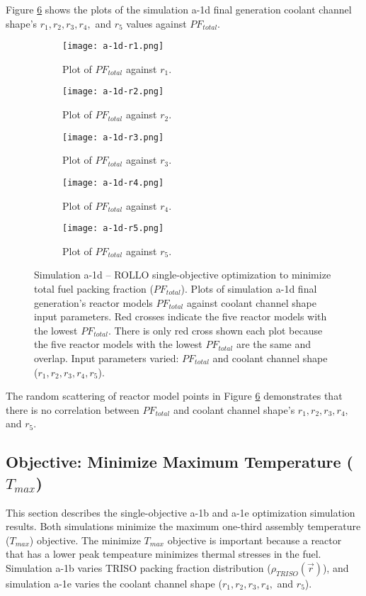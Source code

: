 Figure \ref{fig:a-1d} shows the plots of the simulation a-1d final generation 
coolant channel shape's $r_1, r_2, r_3, r_4,$ and $r_5$ values against $PF_{total}$. 
\begin{figure}[htbp!]
    \centering
    \begin{subfigure}{0.49\textwidth}
        \texttt{[image: a-1d-r1.png]}
        \caption{Plot of $PF_{total}$ against $r_1$.}
        \label{fig:a-1d-r1} 
    \end{subfigure}
    \begin{subfigure}{0.49\textwidth}
        \texttt{[image: a-1d-r2.png]}
        \caption{Plot of $PF_{total}$ against $r_2$.}
        \label{fig:a-1d-r2} 
    \end{subfigure}
    \begin{subfigure}{0.49\textwidth}
        \texttt{[image: a-1d-r3.png]}
        \caption{Plot of $PF_{total}$ against $r_3$.}
        \label{fig:a-1d-r3} 
    \end{subfigure}
    \begin{subfigure}{0.49\textwidth}
        \texttt{[image: a-1d-r4.png]}
        \caption{Plot of $PF_{total}$ against $r_4$.}
        \label{fig:a-1d-r4} 
    \end{subfigure}
    \begin{subfigure}{0.49\textwidth}
        \texttt{[image: a-1d-r5.png]}
        \caption{Plot of $PF_{total}$ against $r_5$.}
        \label{fig:a-1d-r5} 
    \end{subfigure}
    \caption{Simulation a-1d -- ROLLO single-objective optimization to minimize 
    total fuel packing fraction ($PF_{total}$). 
    Plots of simulation a-1d final generation's reactor models $PF_{total}$ against 
    coolant channel shape input parameters. 
    Red crosses indicate the five reactor models with the lowest $PF_{total}$.
    There is only red cross shown each plot because the five reactor models with the 
    lowest $PF_{total}$ are the same and overlap.
    Input parameters varied:
    $PF_{total}$ and coolant channel shape ($r_1, r_2, r_3, r_4, r_5$).}
    \label{fig:a-1d}
\end{figure}
The random scattering of reactor model points in Figure \ref{fig:a-1d}
demonstrates that there is no correlation between $PF_{total}$ 
and coolant channel shape's $r_1, r_2, r_3, r_4,$ and $r_5$. 

\subsection{Objective: Minimize Maximum Temperature ($T_{max}$)}
\label{sec:assem-1-obj-temp}
This section describes the single-objective a-1b and a-1e optimization simulation 
results. 
Both simulations minimize the maximum one-third assembly temperature ($T_{max}$) 
objective. 
The minimize $T_{max}$ objective is important because a reactor that has a lower 
peak tempeature minimizes thermal stresses in the fuel. 
Simulation a-1b varies \gls{TRISO} packing fraction distribution 
($\rho_{TRISO}(\vec{r})$), and simulation a-1e varies the coolant channel shape
($r_1, r_2, r_3, r_4,$ and $r_5$). 

